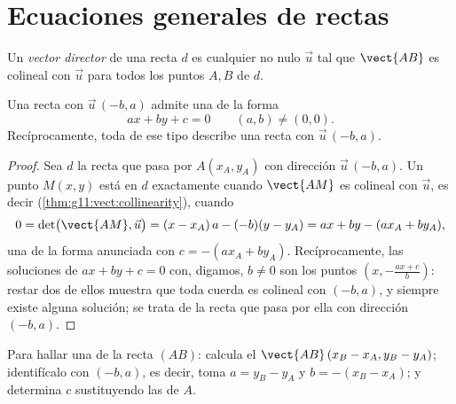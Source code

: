 \section{Ecuaciones generales de rectas}

\begin{definition}\label{def:g11:vect:direction}
Un \emph{vector director} de una recta $d$ es
cualquier  no nulo $\vec u$ tal que $\vect{AB}$ es colineal con
$\vec u$ para todos los puntos $A, B$ de $d$.
\end{definition}

\begin{theorem}\label{thm:g11:vect:cartesian}
Una recta con  $\vec u\,(-b, a)$ admite una  de la
forma
\[
ax + by + c = 0
\qquad (a, b) \neq (0, 0).
\]
Recíprocamente, toda  de ese tipo describe una recta con  $\vec u\,(-b, a)$.
\end{theorem}

\begin{proof}
Sea $d$ la recta que pasa por $A(x_A, y_A)$ con dirección
$\vec u\,(-b, a)$. Un punto $M(x, y)$ está en $d$ exactamente cuando
$\vect{AM}$ es colineal con $\vec u$, es decir
(\cref{thm:g11:vect:collinearity}), cuando
\[
0 = \det\bigl(\vect{AM}, \vec u\bigr)
= (x - x_A)\,a - (-b)(y - y_A)
= ax + by - (a x_A + b y_A),
\]
una  de la forma anunciada con $c = -(a x_A + b y_A)$.
Recíprocamente, las soluciones de $ax + by + c = 0$ con, digamos,
$b \neq 0$ son los puntos $\left(x, -\frac{a x + c}{b}\right)$: restar dos
de ellos muestra que toda cuerda es colineal con $(-b, a)$, y siempre
existe alguna solución; se trata de la recta que pasa por ella con
dirección $(-b, a)$.
\end{proof}

\begin{method}\label{met:g11:vect:twopoints}
Para hallar una  de la recta $(AB)$: calcula el 
$\vect{AB}\,(x_B - x_A, y_B - y_A)$; identifícalo con $(-b, a)$, es decir,
toma $a = y_B - y_A$ y $b = -(x_B - x_A)$; y determina $c$ sustituyendo
las  de $A$.
\end{method}


